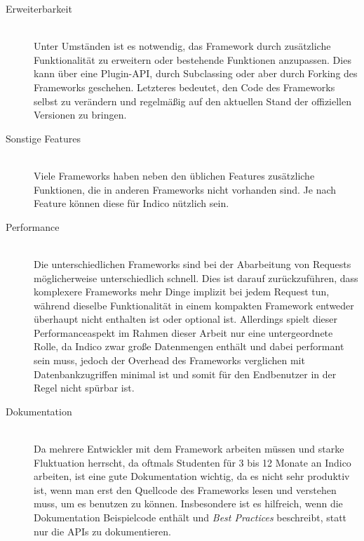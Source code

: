 \begin{description}
\item[Erweiterbarkeit] \hfill \\
Unter Umständen ist es notwendig, das Framework durch zusätzliche Funktionalität zu erweitern oder
bestehende Funktionen anzupassen. Dies kann über eine Plugin-API, durch Subclassing oder aber durch
Forking des Frameworks geschehen. Letzteres bedeutet, den Code des Frameworks selbst zu verändern
und regelmäßig auf den aktuellen Stand der offiziellen Versionen zu bringen.

\item[Sonstige Features] \hfill \\
Viele Frameworks haben neben den üblichen Features zusätzliche Funktionen, die in anderen Frameworks
nicht vorhanden sind. Je nach Feature können diese für Indico nützlich sein.

\item[Performance] \hfill \\
Die unterschiedlichen Frameworks sind bei der Abarbeitung von Requests möglicherweise
unterschiedlich schnell. Dies ist darauf zurückzuführen, dass komplexere Frameworks mehr Dinge
implizit bei jedem Request tun, während dieselbe Funktionalität in einem kompakten Framework
entweder überhaupt nicht enthalten ist oder optional ist. Allerdings spielt dieser Performanceaspekt
im Rahmen dieser Arbeit nur eine untergeordnete Rolle, da Indico zwar große Datenmengen enthält und
dabei performant sein muss, jedoch der Overhead des Frameworks verglichen mit Datenbankzugriffen
minimal ist und somit für den Endbenutzer in der Regel nicht spürbar ist.

\item[Dokumentation] \hfill \\
Da mehrere Entwickler mit dem Framework arbeiten müssen und starke Fluktuation herrscht, da oftmals
Studenten für 3 bis 12 Monate an Indico arbeiten, ist eine gute Dokumentation wichtig, da es nicht
sehr produktiv ist, wenn man erst den Quellcode des Frameworks lesen und verstehen muss, um es
benutzen zu können. Insbesondere ist es hilfreich, wenn die Dokumentation Beispielcode enthält und
\emph{Best Practices} beschreibt, statt nur die APIs zu dokumentieren.


\end{description}
